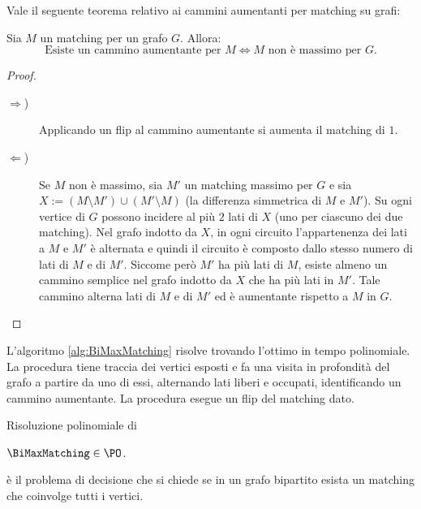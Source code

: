 Vale il seguente teorema relativo ai cammini aumentanti per matching su grafi:
\begin{theorem}
	Sia $M$ un matching per un grafo $G$. Allora:
	\begin{equation*}
		\text{Esiste un cammino aumentante per $M$} \iff \text{$M$ non è massimo per $G$.}
	\end{equation*}
\end{theorem}
\begin{proof}~
	\begin{description}
		\item[$\Rightarrow$)] Applicando un flip al cammino aumentante si aumenta il matching di $1$.
		\item[$\Leftarrow$)] Se $M$ non è massimo, sia $M'$ un matching massimo per $G$ e sia $X:=(M\setminus M')\cup(M'\setminus M)$ (la differenza simmetrica di $M$ e $M'$).
			Su ogni vertice di $G$ possono incidere al più $2$ lati di $X$ (uno per ciascuno dei due matching).
			Nel grafo indotto da $X$, in ogni circuito l'appartenenza dei lati a $M$ e $M'$ è alternata e quindi il circuito è composto dallo stesso numero di lati di $M$ e di $M'$.
			Siccome però $M'$ ha più lati di $M$, esiste almeno un cammino semplice nel grafo indotto da $X$ che ha più lati in $M'$.
			Tale cammino alterna lati di $M$ e di $M'$ ed è aumentante rispetto a $M$ in $G$.
	\end{description}
\end{proof}

L'algoritmo \ref{alg:BiMaxMatching} risolve \BiMaxMatching trovando l'ottimo in tempo polinomiale.
La procedura \FindAugmenting tiene traccia dei vertici esposti e fa una visita in profondità del grafo a partire da uno di essi, alternando lati liberi e occupati, identificando un cammino aumentante.
La procedura \Flip esegue un flip del matching dato.

\begin{algorithm}
	
	\caption{Risoluzione polinomiale di \BiMaxMatching}
	\label{alg:BiMaxMatching}
\end{algorithm}

\begin{corollario}
	$\BiMaxMatching\in\PO$.
\end{corollario}

\PerfectMatching è il problema di decisione che si chiede se in un grafo bipartito esista un matching che coinvolge tutti i vertici.

